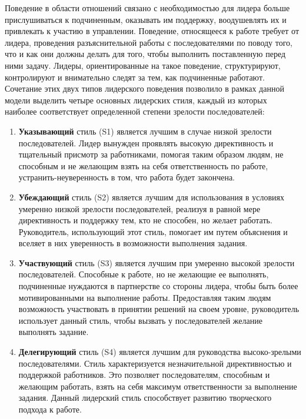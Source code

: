 \documentclass[a4paper,12pt,oneside,final]{extarticle}
\numberwithin{equation}{section}
\begin{document}
Поведение в области отношений связано с необходимостью для лидера больше прислушиваться к подчиненным, оказывать им поддержку, воодушевлять их и привлекать к участию в управлении. 
Поведение, относящееся к работе требует от лидера, проведения разъяснительной работы с последователями по поводу того, что и как они должны делать для того, чтобы выполнить поставленную перед ними задачу. 
Лидеры, ориентированные на такое поведение, структурируют, контролируют и внимательно следят за тем, как подчиненные работают. 
Сочетание этих двух типов лидерского поведения позволило в рамках данной модели выделить четыре основных лидерских стиля, каждый из которых наиболее соответствует определенной степени зрелости последователей:
\begin{enumerate}
	\item \textbf{Указывающий} стиль (S1) является лучшим в случае низкой зрелости последователей. 
	Лидер вынужден проявлять высокую директивность и тщательный присмотр за работниками, помогая таким образом людям, не способным и не желающим взять на себя ответственность по работе, устранить-неуверенность в том, что работа будет закончена.
	\item \textbf{Убеждающий} стиль (S2) является лучшим для использования в условиях умеренно низкой зрелости последователей, реализуя в равной мере директивность и поддержку тем, кто не способен, но желает работать. 
	Руководитель, использующий этот стиль, помогает им путем объяснения и вселяет в них уверенность в возможности выполнения задания.
	\item \textbf{Участвующий} стиль (S3) является лучшим при умеренно высокой зрелости последователей. 
	Способные к работе, но не желающие ее выполнять, подчиненные нуждаются в партнерстве со стороны лидера, чтобы быть более мотивированными на выполнение работы. 
	Предоставляя таким людям возможность участвовать в принятии решений на своем уровне, руководитель использует данный стиль, чтобы вызвать у последователей желание выполнять задание.
	\item \textbf{Делегирующий} стиль (S4) является лучшим для руководства высоко-зрелыми последователями. 
	Стиль характеризуется незначительной директивностью и поддержкой работников. 
	Это позволяет последователям, способным и желающим работать, взять на себя максимум ответственности за выполнение задания. 
	Данный лидерский стиль способствует развитию творческого подхода к работе.
\end{enumerate}
\end{document}
